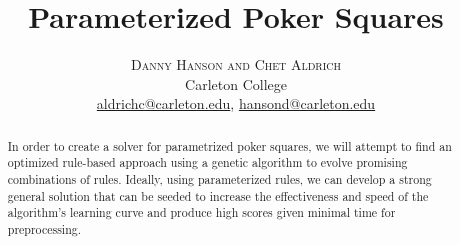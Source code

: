 \documentclass[twoside]{article}
\title{\vspace{-15mm}\fontsize{20pt}{10pt}\selectfont\textbf{Parameterized Poker Squares}} %
\author{
\large
\textsc{Danny Hanson and Chet Aldrich} \\
\normalsize Carleton College \\
\normalsize \href{mailto:aldrichc@carleton.edu}{aldrichc@carleton.edu},
\normalsize \href{mailto:hansond@carleton.edu}{hansond@carleton.edu}
\vspace{-5mm}
}
\date{}
\begin{document}
\maketitle %

\thispagestyle{fancy} %


\begin{abstract}

\noindent In order to create a solver for parametrized poker squares, we will attempt to find an optimized rule-based approach using a genetic algorithm to evolve promising combinations of rules. Ideally, using parameterized rules, we can develop a strong general solution that can be seeded to increase the effectiveness and speed of the algorithm's learning curve and produce high scores given minimal time for preprocessing.

\end{abstract}

\end{document}
